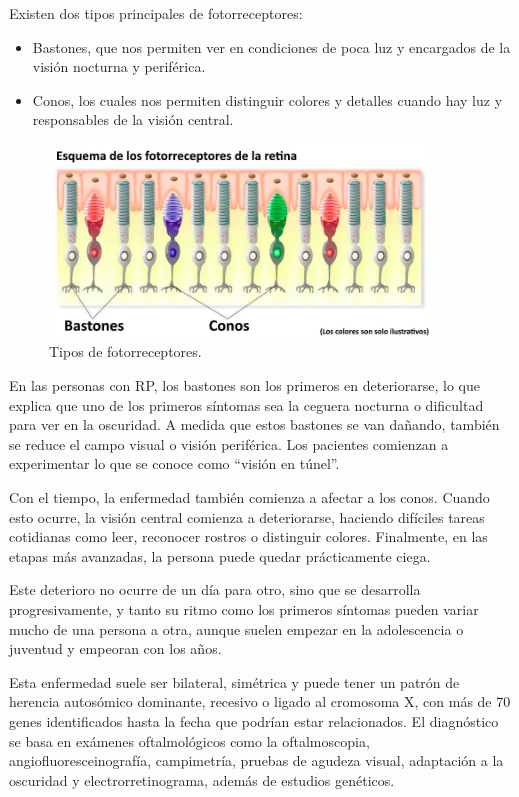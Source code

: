 \documentclass[11pt,spanish,listoffigures,listoftables]{tfgetsinf}
\begin{document}
Existen dos tipos principales de fotorreceptores: 

\begin{itemize}
\item Bastones, que nos permiten ver en condiciones de poca luz y encargados de la visión nocturna y periférica. 
\item Conos, los cuales nos permiten distinguir colores y detalles cuando hay luz y responsables de la visión central. 
\end{itemize}

\begin{figure}[H]
   \centering
   \includegraphics[width=0.9\textwidth]{fotorreceptores.jpg}
   \caption{Tipos de fotorreceptores.}
   \label{fig:etiqueta_opcional22}
\end{figure}

En las personas con \acs{RP}, los bastones son los primeros en deteriorarse, lo que explica que uno de los primeros síntomas sea la ceguera nocturna o dificultad para ver en la oscuridad. A medida que estos bastones se van dañando, también se reduce el campo visual o visión periférica. Los pacientes comienzan a experimentar lo que se conoce como “visión en túnel”.

Con el tiempo, la enfermedad también comienza a afectar a los conos. Cuando esto ocurre, la visión central comienza a deteriorarse, haciendo difíciles tareas cotidianas como leer, reconocer rostros o distinguir colores. Finalmente, en las etapas más avanzadas, la persona puede quedar prácticamente ciega. 

Este deterioro no ocurre de un día para otro, sino que se desarrolla progresivamente, y tanto su ritmo como los primeros síntomas pueden variar mucho de una persona a otra, aunque suelen empezar en la adolescencia o juventud y empeoran con los años. 

Esta enfermedad suele ser bilateral, simétrica y puede tener un patrón de herencia autosómico dominante, recesivo o ligado al cromosoma X, con más de 70 genes identificados hasta la fecha que podrían estar relacionados\cite{GIL}. El diagnóstico se basa en exámenes oftalmológicos como la oftalmoscopia, angiofluoresceinografía, campimetría, pruebas de agudeza visual, adaptación a la oscuridad y electrorretinograma, además de estudios genéticos\cite{VIS}.
\end{document}
